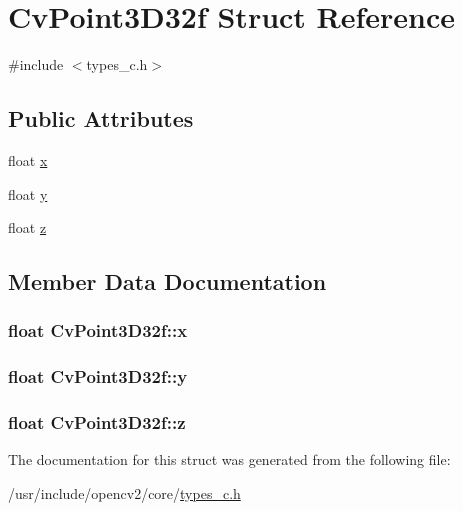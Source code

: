 \hypertarget{structCvPoint3D32f}{\section{Cv\-Point3\-D32f Struct Reference}
\label{structCvPoint3D32f}
}


{\ttfamily \#include $<$types\-\_\-c.\-h$>$}

\subsection*{Public Attributes}
\begin{DoxyCompactItemize}
\item 
float \hyperlink{structCvPoint3D32f_a4fb64db2fa03a13e95b220de72fa3eb7}{x}
\item 
float \hyperlink{structCvPoint3D32f_a7947fcc11be038f46e43b6e86f713671}{y}
\item 
float \hyperlink{structCvPoint3D32f_a50eaa5751c0bfe4bd17a257040f3a251}{z}
\end{DoxyCompactItemize}


\subsection{Member Data Documentation}
\hypertarget{structCvPoint3D32f_a4fb64db2fa03a13e95b220de72fa3eb7}{
\subsubsection[{x}]{\setlength{\rightskip}{0pt plus 5cm}float Cv\-Point3\-D32f\-::x}}\label{structCvPoint3D32f_a4fb64db2fa03a13e95b220de72fa3eb7}
\hypertarget{structCvPoint3D32f_a7947fcc11be038f46e43b6e86f713671}{
\subsubsection[{y}]{\setlength{\rightskip}{0pt plus 5cm}float Cv\-Point3\-D32f\-::y}}\label{structCvPoint3D32f_a7947fcc11be038f46e43b6e86f713671}
\hypertarget{structCvPoint3D32f_a50eaa5751c0bfe4bd17a257040f3a251}{
\subsubsection[{z}]{\setlength{\rightskip}{0pt plus 5cm}float Cv\-Point3\-D32f\-::z}}\label{structCvPoint3D32f_a50eaa5751c0bfe4bd17a257040f3a251}


The documentation for this struct was generated from the following file\-:\begin{DoxyCompactItemize}
\item 
/usr/include/opencv2/core/\hyperlink{core_2types__c_8h}{types\-\_\-c.\-h}\end{DoxyCompactItemize}
